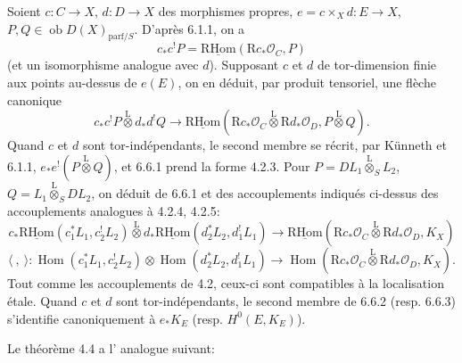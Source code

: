 \documentclass[11pt]{article}
\providecommand{\cO}{\mathcal{O}}
\DeclareMathOperator{\Hom}{Hom}
\newcommand{\R}{\mathrm{R}}\newcommand{\RHomCore}{\mathrm{RHom}}
\providecommand{\RHom}{\RHomCore}
\providecommand{\uRHom}{\underline{\RHom}}
\providecommand{\RHom}{\RHomCore}
\providecommand{\Hom}{\operatorname{Hom}}
\providecommand{\RHom}{\R\mathcal{H}om}
\providecommand{\R}{\mathrm R}
\providecommand{\RHom}{\RHomCore}
\providecommand{\Hom}{\operatorname{Hom}}
\begin{document}
Soient $c:C\to X$, $d:D\to X$ des morphismes propres, $e=c\times_Xd:E\to X$, $P,Q\in\operatorname{ob}D(X)_{\mathrm{parf}/S}$. D'après 6.1.1, on a
\[
c_*c^!P=\uRHom(\mathrm{R}c_*\cO_C,P)
\]
(et un isomorphisme analogue avec $d$). Supposant $c$ et $d$ de tor-dimension finie aux points au-dessus de $e(E)$, on en déduit, par produit tensoriel, une flèche canonique
\begin{equation}
\tag{6.6.1}
c_*c^!P\overset{\mathrm{L}}{\otimes}d_*d^!Q\longrightarrow
\uRHom(\mathrm{R}c_*\cO_C\overset{\mathrm{L}}{\otimes}\mathrm{R}d_*\cO_D,P\overset{\mathrm{L}}{\otimes}Q).
\end{equation}
Quand $c$ et $d$ sont tor-indépendants, le second membre se récrit, par Künneth et 6.1.1, $e_*e^!(P\overset{\mathrm{L}}{\otimes}Q)$, et 6.6.1 prend la forme 4.2.3. Pour $P=DL_1\overset{\mathrm{L}}{\otimes}_SL_2$, $Q=L_1\overset{\mathrm{L}}{\otimes}_SDL_2$, on déduit de 6.6.1 et des accouplements indiqués ci-dessus des accouplements analogues à 4.2.4, 4.2.5:
\begin{equation}
\tag{6.6.2}
c_*\uRHom(c_1^*L_1,c_2^!L_2)\overset{\mathrm{L}}{\otimes}d_*\uRHom(d_2^*L_2,d_1^!L_1)
\longrightarrow\uRHom(\mathrm{R}c_*\cO_C\overset{\mathrm{L}}{\otimes}\mathrm{R}d_*\cO_D,K_X)
\end{equation}
\begin{equation}
\tag{6.6.3}
\langle\ ,\ \rangle:\Hom(c_1^*L_1,c_2^!L_2)\otimes\Hom(d_2^*L_2,d_1^!L_1)
\longrightarrow\Hom(\mathrm{R}c_*\cO_C\overset{\mathrm{L}}{\otimes}\mathrm{R}d_*\cO_D,K_X).
\end{equation}
Tout comme les accouplements de 4.2, ceux-ci sont compatibles à la localisation étale. Quand $c$ et $d$ sont tor-indépendants, le second membre de 6.6.2 (resp. 6.6.3) s'identifie canoniquement à $e_*K_E$ (resp. $H^0(E,K_E)$).

Le théorème 4.4 a l'%
analogue suivant:
\end{document}
